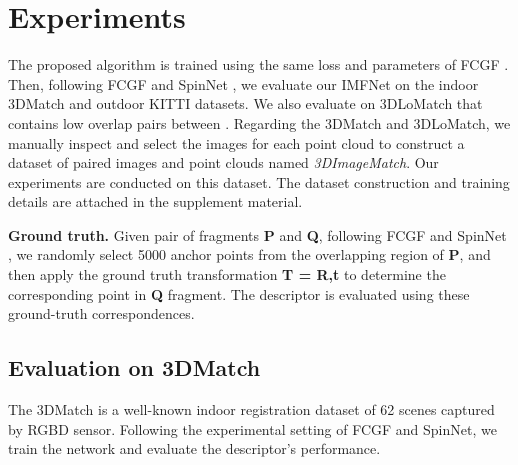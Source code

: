 \documentclass[10pt,twocolumn,letterpaper]{article}
\begin{document}
 
\section{Experiments}

The proposed algorithm is trained using the same loss and parameters of FCGF \cite{choy2019fully}. Then, following FCGF \cite{choy2019fully} and SpinNet \cite{ao2021spinnet}, we evaluate our IMFNet on the indoor 3DMatch \cite{zeng20173dmatch} and outdoor KITTI \cite{geiger2012we} datasets. We also evaluate on 3DLoMatch \cite{huang2021predator} that contains low overlap pairs between . Regarding the 3DMatch and 3DLoMatch, we manually inspect and select the images for each point cloud to construct a dataset of paired images and point clouds named \textit{3DImageMatch}. Our experiments are conducted on this dataset. The dataset construction and training details are attached in the supplement material.

\textbf{Ground truth.}
Given pair of fragments \textbf{P} and \textbf{Q}, following FCGF\cite{choy2019fully} and SpinNet \cite{ao2021spinnet}, we randomly select 5000 anchor points from the overlapping region of \textbf{P}, and then apply the ground truth transformation \textbf{T = R,t} to determine the corresponding point in \textbf{Q} fragment. The descriptor is evaluated using these ground-truth correspondences.


\subsection{Evaluation on 3DMatch}
The 3DMatch \cite{zeng20173dmatch}  is a well-known indoor registration dataset of 62 scenes captured by RGBD sensor. Following the experimental setting of FCGF and SpinNet, we train the network and evaluate the descriptor's performance. 
\end{document}
